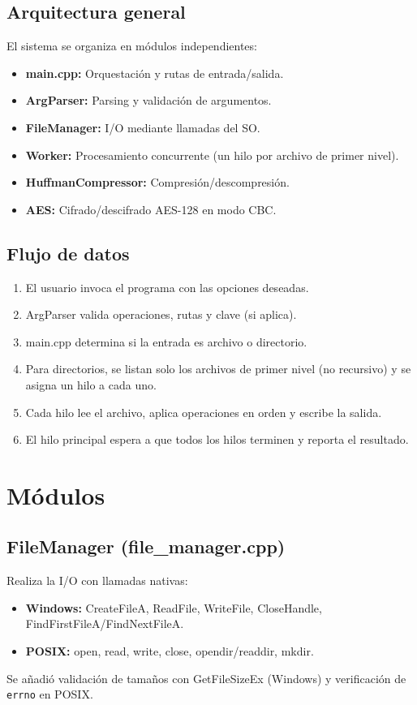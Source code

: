 \documentclass[12pt,a4paper]{article}
\begin{document}
\subsection{Arquitectura general}
El sistema se organiza en módulos independientes:
\begin{itemize}
    \item \textbf{main.cpp:} Orquestación y rutas de entrada/salida.
    \item \textbf{ArgParser:} Parsing y validación de argumentos.
    \item \textbf{FileManager:} I/O mediante llamadas del SO.
    \item \textbf{Worker:} Procesamiento concurrente (un hilo por archivo de primer nivel).
    \item \textbf{HuffmanCompressor:} Compresión/descompresión.
    \item \textbf{AES:} Cifrado/descifrado AES-128 en modo CBC.
\end{itemize}

\subsection{Flujo de datos}
\begin{enumerate}
    \item El usuario invoca el programa con las opciones deseadas.
    \item ArgParser valida operaciones, rutas y clave (si aplica).
    \item main.cpp determina si la entrada es archivo o directorio.
    \item Para directorios, se listan solo los archivos de primer nivel (no recursivo) y se asigna un hilo a cada uno.
    \item Cada hilo lee el archivo, aplica operaciones en orden y escribe la salida.
    \item El hilo principal espera a que todos los hilos terminen y reporta el resultado.
\end{enumerate}

\section{Módulos}

\subsection{FileManager (file\_manager.cpp)}
Realiza la I/O con llamadas nativas:
\begin{itemize}
    \item \textbf{Windows:} CreateFileA, ReadFile, WriteFile, CloseHandle, FindFirstFileA/FindNextFileA.
    \item \textbf{POSIX:} open, read, write, close, opendir/readdir, mkdir.
\end{itemize}
Se añadió validación de tamaños con GetFileSizeEx (Windows) y verificación de \texttt{errno} en POSIX.
\end{document}
